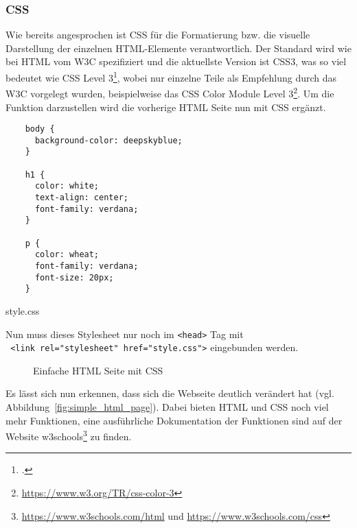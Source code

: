 \subsubsection{CSS}
Wie bereits angesprochen ist \ac*{CSS} für die Formatierung bzw. die visuelle
Darstellung der einzelnen HTML-Elemente verantwortlich. Der Standard wird wie
bei HTML vom \acs*{W3C} spezifiziert und die aktuellste Version ist CSS3, was so
viel bedeutet wie \acs*{CSS} Level 3\footcite[]{w3ccss}, wobei nur einzelne Teile als Empfehlung
durch das \acs*{W3C} vorgelegt wurden, beispielweise das CSS Color Module Level
3\footnote{\url{https://www.w3.org/TR/css-color-3}}. Um die Funktion
darzustellen wird die vorherige HTML Seite nun mit CSS ergänzt.

\begin{listing}[H]
  \begin{verbatim}
    body {
      background-color: deepskyblue;
    }

    h1 {
      color: white;
      text-align: center;
      font-family: verdana;
    }

    p {
      color: wheat;
      font-family: verdana;
      font-size: 20px;
    }
  \end{verbatim}
  \caption{style.css}
\end{listing}

Nun muss dieses Stylesheet nur noch im \verb|<head>| Tag mit\\
\texttt{  <link rel="stylesheet" href="style.css">} eingebunden werden.

\begin{figure}[H]
  \centering
  \caption{Einfache HTML Seite mit CSS}
\end{figure}

Es lässt sich nun erkennen, dass sich die Webseite deutlich verändert hat (vgl. Abbildung~\ref{fig:simple_html_page}). Dabei
bieten HTML und CSS noch viel mehr Funktionen, eine ausführliche
Dokumentation der Funktionen sind auf der Website
w3schools\footnote{\url{https://www.w3schools.com/html} und
\url{https://www.w3schools.com/css}} zu finden.

